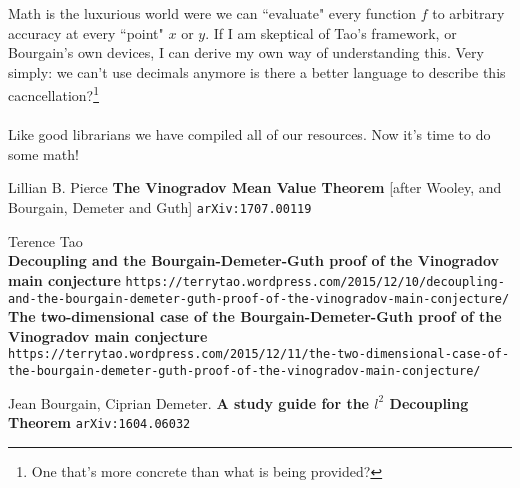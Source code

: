 \documentclass[12pt]{article}
\begin{document}
\newpage
\noindent Math is the luxurious world were we can ``evaluate" every function $f$ to arbitrary accuracy at every ``point" $x$ or $y$.  If I am skeptical of Tao's framework, or Bourgain's own devices, I can derive my own way of understanding this.  Very simply: we can't use decimals anymore is there a better language to describe this cacncellation?\footnote{One that's more concrete than what is being provided?} \\ \\
Like good librarians we have compiled all of our resources.  Now it's time to do some math! 

\vfill



\begin{thebibliography}{}

\item Lillian B. Pierce 
\textbf{
The Vinogradov Mean Value Theorem }[after Wooley, and Bourgain, Demeter and Guth] \texttt{arXiv:1707.00119}

\item Terence Tao \\
\textbf{Decoupling and the Bourgain-Demeter-Guth proof of the Vinogradov main conjecture}
\texttt{https://terrytao.wordpress.com/2015/12/10/decoupling-and-the-bourgain-demeter-guth-proof-of-the-vinogradov-main-conjecture/} \\ 
\textbf{The two-dimensional case of the Bourgain-Demeter-Guth proof of the Vinogradov main conjecture}
\texttt{https://terrytao.wordpress.com/2015/12/11/the-two-dimensional-case-of-the-bourgain-demeter-guth-proof-of-the-vinogradov-main-conjecture/}

\item Jean Bourgain, Ciprian Demeter. \textbf{A study guide for the $l^2$ Decoupling Theorem}  \texttt{arXiv:1604.06032}

\end{thebibliography}
\end{document}
